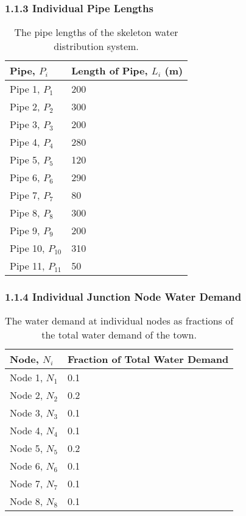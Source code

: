 \documentclass[]{article}
\begin{document}
	\subsubsection{1.1.3 Individual Pipe Lengths}
	\begin{table}[H]
	\centering
	\begin{tabular}{|M{3cm}|M{2.5cm}|}
		\hline
		Pipe, $P_i$ &  Length of Pipe, $L_i$ (m) \\ \hline
		Pipe 1, $P_1$  & 200 \\ \hline
		Pipe 2, $P_2$  & 300 \\ \hline
		Pipe 3, $P_3$ & 200  \\ \hline
		Pipe 4, $P_4$ & 280 \\ \hline
		Pipe 5, $P_5$ & 120 \\ \hline
		Pipe 6, $P_6$ & 290 \\ \hline
		Pipe 7, $P_7$ & 80 \\ \hline
		Pipe 8, $P_8$ & 300 \\ \hline
		Pipe 9, $P_9$ & 200 \\ \hline
		Pipe 10, $P_{10}$ & 310 \\ \hline
		Pipe 11, $P_{11}$ & 50 \\ \hline
	\end{tabular}
	\caption[Pipe Lengths of the Water Distribution System]{The pipe lengths of the skeleton water distribution system.}
\end{table}
\subsubsection{1.1.4 Individual Junction Node Water Demand}
	\begin{table}[H]
	\centering
	\begin{tabular}{|M{3cm}|M{3cm}|}
		\hline
		 Node, $N_i$ &  Fraction of Total Water Demand \\ \hline
		Node 1, $N_1$  & 0.1 \\ \hline
		Node 2, $N_2$  & 0.2 \\ \hline
		Node 3, $N_3$ & 0.1  \\ \hline
		Node 4, $N_4$ & 0.1 \\ \hline
		Node 5, $N_5$ & 0.2 \\ \hline
		Node 6, $N_6$ & 0.1 \\ \hline
		Node 7, $N_7$ & 0.1 \\ \hline
		Node 8, $N_8$ & 0.1 \\ \hline
	\end{tabular}
	\caption[Water Demand at Nodes]{The water demand at individual nodes as fractions of the total water demand of the town.}
\end{table}
\end{document}
